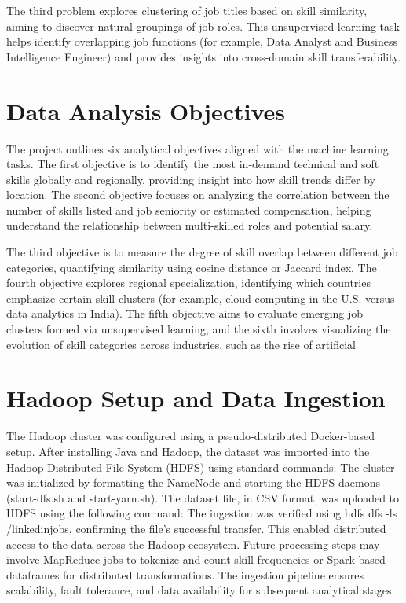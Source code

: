 \documentclass[conference]{IEEEtran}
\begin{document}
The third problem explores clustering of job titles based on skill similarity, aiming to discover natural groupings of job roles. This unsupervised learning task helps identify overlapping job functions (for example, Data Analyst and Business Intelligence Engineer) and provides insights into cross-domain skill transferability.

\section{Data Analysis Objectives}
The project outlines six analytical objectives aligned with the machine learning tasks. The first objective is to identify the most in-demand technical and soft skills globally and regionally, providing insight into how skill trends differ by location. The second objective focuses on analyzing the correlation between the number of skills listed and job seniority or estimated compensation, helping understand the relationship between multi-skilled roles and potential salary.

The third objective is to measure the degree of skill overlap between different job categories, quantifying similarity using cosine distance or Jaccard index. The fourth objective explores regional specialization, identifying which countries emphasize certain skill clusters (for example, cloud computing in the U.S. versus data analytics in India). The fifth objective aims to evaluate emerging job clusters formed via unsupervised learning, and the sixth involves visualizing the evolution of skill categories across industries, such as the rise of artificial

\section{\textbf{Hadoop Setup and Data Ingestion}}
The Hadoop cluster was configured using a pseudo-distributed Docker-based setup. After installing Java and Hadoop, the dataset was imported into the Hadoop Distributed File System (HDFS) using standard commands. The cluster was initialized by formatting the NameNode and starting the HDFS daemons (start-dfs.sh and start-yarn.sh). The dataset file, in CSV format, was uploaded to HDFS using the following command:
The ingestion was verified using hdfs dfs -ls /linkedinjobs, confirming the file’s successful transfer. This enabled distributed access to the data across the Hadoop ecosystem. Future processing steps may involve MapReduce jobs to tokenize and count skill frequencies or Spark-based dataframes for distributed transformations. The ingestion pipeline ensures scalability, fault tolerance, and data availability for subsequent analytical stages.
\end{document}
